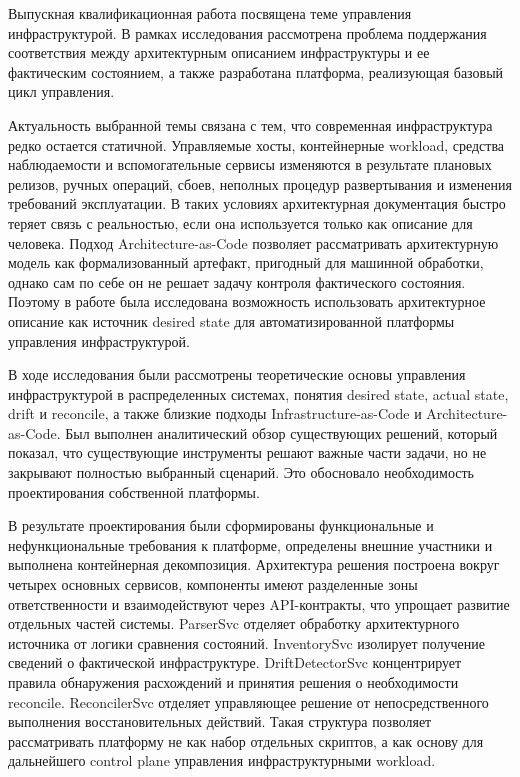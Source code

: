 \conclusion

Выпускная квалификационная работа посвящена теме управления инфраструктурой. В рамках исследования рассмотрена проблема поддержания соответствия между архитектурным описанием инфраструктуры и ее фактическим состоянием, а также разработана платформа, реализующая базовый цикл управления.

Актуальность выбранной темы связана с тем, что современная инфраструктура редко остается статичной. Управляемые хосты, контейнерные workload, средства наблюдаемости и вспомогательные сервисы изменяются в результате плановых релизов, ручных операций, сбоев, неполных процедур развертывания и изменения требований эксплуатации. В таких условиях архитектурная документация быстро теряет связь с реальностью, если она используется только как описание для человека. Подход Architecture-as-Code позволяет рассматривать архитектурную модель как формализованный артефакт, пригодный для машинной обработки, однако сам по себе он не решает задачу контроля фактического состояния. Поэтому в работе была исследована возможность использовать архитектурное описание как источник desired state для автоматизированной платформы управления инфраструктурой.

В ходе исследования были рассмотрены теоретические основы управления инфраструктурой в распределенных системах, понятия desired state, actual state, drift и reconcile, а также близкие подходы Infrastructure-as-Code и Architecture-as-Code. Был выполнен аналитический обзор существующих решений, который показал, что существующие инструменты решают важные части задачи, но не закрывают полностью выбранный сценарий. Это обосновало необходимость проектирования собственной платформы.

В результате проектирования были сформированы функциональные и нефункциональные требования к платформе, определены внешние участники и выполнена контейнерная декомпозиция. Архитектура решения построена вокруг четырех основных сервисов, компоненты имеют разделенные зоны ответственности и взаимодействуют через API-контракты, что упрощает развитие отдельных частей системы. ParserSvc отделяет обработку архитектурного источника от логики сравнения состояний. InventorySvc изолирует получение сведений о фактической инфраструктуре. DriftDetectorSvc концентрирует правила обнаружения расхождений и принятия решения о необходимости reconcile. ReconcilerSvc отделяет управляющее решение от непосредственного выполнения восстановительных действий. Такая структура позволяет рассматривать платформу не как набор отдельных скриптов, а как основу для дальнейшего control plane управления инфраструктурными workload.

